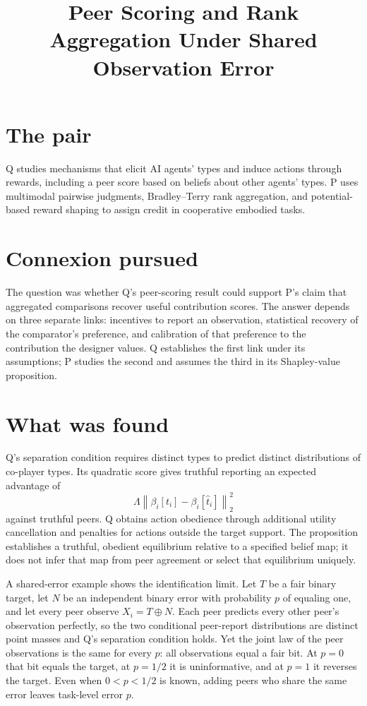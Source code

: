 \documentclass{article}
\title{Peer Scoring and Rank Aggregation Under Shared Observation Error}
\begin{document}
\maketitle

\section{The pair}

Q studies mechanisms that elicit AI agents' types and induce actions through rewards, including a peer score based on beliefs about other agents' types. P uses multimodal pairwise judgments, Bradley--Terry rank aggregation, and potential-based reward shaping to assign credit in cooperative embodied tasks. 

\section{Connexion pursued}

The question was whether Q's peer-scoring result could support P's claim that aggregated comparisons recover useful contribution scores. The answer depends on three separate links: incentives to report an observation, statistical recovery of the comparator's preference, and calibration of that preference to the contribution the designer values. Q establishes the first link under its assumptions; P studies the second and assumes the third in its Shapley-value proposition. 

\section{What was found}

Q's separation condition requires distinct types to predict distinct distributions of co-player types. Its quadratic score gives truthful reporting an expected advantage of
\[
\Lambda\left\lVert
\beta_i[t_i]-\beta_i[\hat t_i]
\right\rVert_2^2
\]
against truthful peers. Q obtains action obedience through additional utility cancellation and penalties for actions outside the target support. The proposition establishes a truthful, obedient equilibrium relative to a specified belief map; it does not infer that map from peer agreement or select that equilibrium uniquely. 

A shared-error example shows the identification limit. Let \(T\) be a fair binary target, let \(N\) be an independent binary error with probability \(p\) of equaling one, and let every peer observe \(X_i=T\oplus N\). Each peer predicts every other peer's observation perfectly, so the two conditional peer-report distributions are distinct point masses and Q's separation condition holds. Yet the joint law of the peer observations is the same for every \(p\): all observations equal a fair bit. At \(p=0\) that bit equals the target, at \(p=1/2\) it is uninformative, and at \(p=1\) it reverses the target. Even when \(0<p<1/2\) is known, adding peers who share the same error leaves task-level error \(p\). 
\end{document}
